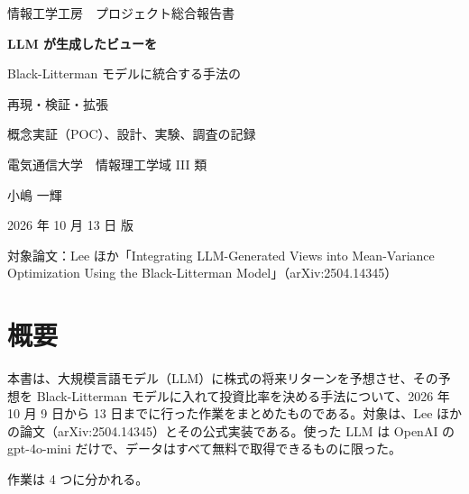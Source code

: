 \documentclass[xelatex,ja=standard,jafont=hiragino-pron,a4paper,10pt]{bxjsreport}
\begin{document}
\begin{titlepage}
\centering
\vspace*{30mm}
{\sffamily\Large 情報工学工房　プロジェクト総合報告書\par}
\vspace{14mm}
{\sffamily\bfseries\huge LLM が生成したビューを\par\vspace{3mm} Black-Litterman モデルに統合する手法の\par\vspace{3mm} 再現・検証・拡張\par}
\vspace{12mm}
{\large 概念実証（POC）、設計、実験、調査の記録\par}
\vspace{30mm}
{\large 電気通信大学　情報理工学域 III 類\par}
\vspace{3mm}
{\Large 小嶋 一輝\par}
\vspace{20mm}
{\large 2026 年 10 月 13 日 版\par}
\vfill
{\small 対象論文：Lee ほか「Integrating LLM-Generated Views into Mean-Variance Optimization Using the Black-Litterman Model」（arXiv:2504.14345）\par}
\end{titlepage}
\hypersetup{pageanchor=true}

\chapter*{概要}

本書は、大規模言語モデル（LLM）に株式の将来リターンを予想させ、その予想を Black-Litterman モデルに入れて投資比率を決める手法について、2026 年 10 月 9 日から 13 日までに行った作業をまとめたものである。対象は、Lee ほかの論文（arXiv:2504.14345）とその公式実装である。使った LLM は OpenAI の gpt-4o-mini だけで、データはすべて無料で取得できるものに限った。

作業は 4 つに分かれる。
\end{document}
